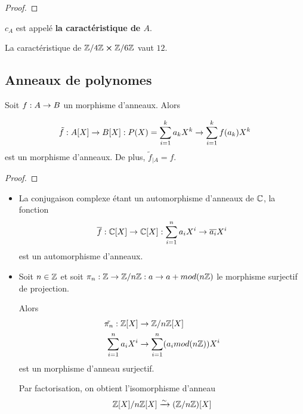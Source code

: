 \ifdefined\outputproof
\begin{proof}

\end{proof}
\fi

\begin{definition}
	$c_{A}$ est appelé \textbf{la caractéristique de $A$}.
\end{definition}

\begin{exemple}
	La caractéristique de $\mathbb{Z}/4\mathbb{Z} \cross \mathbb{Z}/6\mathbb{Z}$ vaut
	$12$.
\end{exemple}

\subsection{Anneaux de polynomes}

\begin{proposition}
	Soit $f : A \rightarrow B$ un morphisme d'anneaux. Alors

	\begin{equation}
		\tilde{f} : A[X] \rightarrow B[X] : P(X) = \sum_{i = 1}^{k} a_{k} X^{k}
	\rightarrow \sum_{i = 1}^{k} f(a_{k}) X^{k}
	\end{equation}
	est un morphisme d'anneaux. De plus, $\tilde{f}_{|A} = f$.
\end{proposition}

\ifdefined\outputproof
\begin{proof}

\end{proof}
\fi

\begin{exemple}
	\begin{itemize}
		\item La conjugaison complexe étant un automorphisme d'anneaux de
			$\mathbb{C}$, la fonction
			\begin{equation}
				\overline{f} : \mathbb{C}[X] \rightarrow \mathbb{C}[X] : \sum_{i =
				1}^{n} a_{i} X^{i} \rightarrow \overline{a_{i}} X^{i}
			\end{equation}
			est un automorphisme d'anneaux.
		\item Soit $n \in \mathbb{Z}$ et soit $\pi_{n} : \mathbb{Z} \rightarrow
			\mathbb{Z} / n \mathbb{Z} : a \rightarrow a + mod(n \mathbb{Z})$ le morphisme surjectif de
		projection.

		Alors
		\begin{align}
			\tilde{\pi_{n}} : \mathbb{Z}[X] & \rightarrow \mathbb{Z} / n \mathbb{Z}[X]
			\\
			\sum_{i = 1}^{n} a_{i} X^{i} & \rightarrow \sum_{i = 1}^{n} (a_{i}
			mod(n \mathbb{Z})) X^{i}
		\end{align}
		est un morphisme d'anneau surjectif.

		Par factorisation, on obtient l'isomorphisme d'anneau
		\begin{equation}
			\mathbb{Z}[X] / n \mathbb{Z}[X] \xrightarrow{\sim} (\mathbb{Z}
			/ n \mathbb{Z})[X]
		\end{equation}

	\end{itemize}
\end{exemple}


